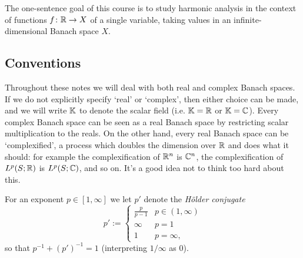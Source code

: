 The one-sentence goal of this course is to study harmonic analysis in the context of functions $f \colon \mathbb{R} \rightarrow X$ of a single variable, taking values in an infinite-dimensional Banach space $X$.


\subsection{Conventions}\label{sec:conventions}
Throughout these notes we will deal with both real and complex Banach spaces.
If we do not explicitly specify `real' or `complex', then either choice can be made, and we will write $\mathbb{K}$ to denote the scalar field (i.e. $\mathbb{K} = \mathbb{R}$ or $\mathbb{K} = \mathbb{C}$).
Every complex Banach space can be seen as a real Banach space by restricting scalar multiplication to the reals.
On the other hand, every real Banach space can be `complexified', a process which doubles the dimension over $\mathbb{R}$ and does what it should: for example the complexification of $\mathbb{R}^n$ is $\mathbb{C}^n$, the complexification of $L^p(S;\mathbb{R})$ is $L^p(S;\mathbb{C})$, and so on.
It's a good idea not to think too hard about this.

For an exponent $p \in [1,\infty]$ we let $p'$ denote the \emph{H\"older conjugate}
\begin{equation*}
  p' := \begin{cases}
    \frac{p}{p-1} & p \in (1,\infty) \\
    \infty & p = 1 \\
    1 & p = \infty,
  \end{cases}
\end{equation*}
so that $p^{-1} + (p')^{-1} = 1$ (interpreting $1/\infty$ as $0$).







